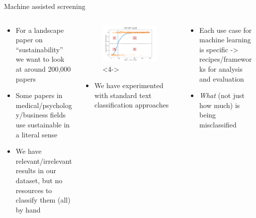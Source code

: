 \documentclass[9pt]{beamer}
\begin{document}
\begin{frame}{Machine assisted screening}

\begin{columns}
	\begin{column}{0.3\linewidth}
		\begin{itemize}
			\item<1-> For a landscape paper on ``sustainability'' we want to look at around 200,000 papers
			\item<2-> Some papers in medical/psychology/business fields use sustainable in a literal sense
			\item<3-> We have relevant/irrelevant results in our dataset, but no resources to classify them (all) by hand
		\end{itemize}
	\end{column}
	\begin{column}{0.4\linewidth}
		\begin{figure}
			\includegraphics[width=\linewidth]{images/example.png}<4->
		\end{figure}
		\begin{itemize}
			\item<5-> We have experimented with standard text classification approaches

		\end{itemize}
	\end{column}
	\begin{column}{0.3\linewidth}
		\begin{itemize}
			\item<6-> Each use case for machine learning is specific -> recipes/frameworks for analysis and evaluation
			\item<7-> \textit{What} (not just how much) is being misclassified
		\end{itemize}
	\end{column}
\end{columns}

\end{frame}
\end{document}

